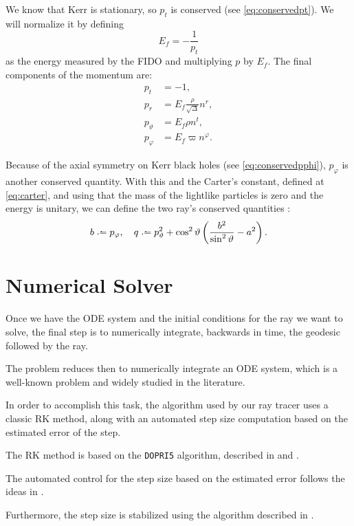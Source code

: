 We know that Kerr is stationary, so $p_t$ is conserved (see \autoref{eq:conservedpt}). We will normalize it by defining
\[
	E_f = - \frac{1}{p_t}
\]  
as the energy measured by the \ac{FIDO} and multiplying $p$ by $E_f$. The final components of the momentum \cite[Eq. (A.11)]{thorne15} are:
\begin{align}
	p_t &= -1, \\
	p_r &= E_f \frac{\rho}{\sqrt{\Delta}} n^r, \\
	p_\vartheta &= E_f \rho n^t, \\
	p_\varphi &= E_f \varpi n^\varphi.
\end{align}

Because of the axial symmetry on Kerr black holes (see \autoref{eq:conservedpphi}), $p_\varphi$ is another conserved quantity. With this and the Carter's constant, defined at \autoref{eq:carter}, and using that the mass of the lightlike particles is zero and the energy is unitary, we can define the two ray's conserved quantities \cite[Eq. (A.12)]{thorne15}:
\begin{equation}
	b \defeq p_\varphi, \quad q \defeq p_\vartheta^2 + \cos^2\vartheta \left( \frac{b^2}{\sin^2\vartheta} - a^2 \right).
\end{equation}

\section{Numerical Solver}
\label{sec:numerical}

Once we have the \ac{ODE} system and the initial conditions for the ray we want to solve, the final step is to numerically integrate, backwards in time, the geodesic followed by the ray.

The problem reduces then to numerically integrate an \ac{ODE} system, which is a well-known problem and widely studied in the literature.

In order to accomplish this task, the algorithm used by our ray tracer uses a classic \ac{RK} method, along with an automated step size computation based on the estimated error of the step.

The \ac{RK} method is based on the \texttt{DOPRI5} algorithm, described in \cite{hairer93} and \cite{hairer96}.

The automated control for the step size based on the estimated error follows the ideas in \cite[Sec. II.4, Subsec. Automatic Step Size Control]{hairer93}.

Furthermore, the step size is stabilized using the algorithm described in \cite[Sec. IV.2]{hairer96}.

